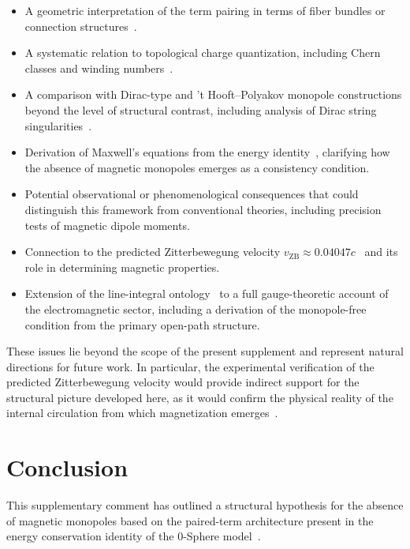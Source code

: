 \documentclass[12pt,letterpaper]{article}
\begin{document}
\begin{itemize}
\item A geometric interpretation of the term pairing in terms of fiber bundles or connection structures~\cite{Nakahara2003}.
\item A systematic relation to topological charge quantization, including Chern classes and winding numbers~\cite{Nakahara2003,tHooft1974}.
\item A comparison with Dirac-type and 't Hooft--Polyakov monopole constructions beyond the level of structural contrast, including analysis of Dirac string singularities~\cite{Dirac1931,tHooft1974,Polyakov1974}.
\item Derivation of Maxwell's equations from the energy identity~\cite{hanamura18203433}, clarifying how the absence of magnetic monopoles emerges as a consistency condition.
\item Potential observational or phenomenological consequences that could distinguish this framework from conventional theories, including precision tests of magnetic dipole moments.
\item Connection to the predicted Zitterbewegung velocity $v_{\mathrm{ZB}} \approx 0.04047c$~\cite{hanamura18356895,hanamura17765409} and its role in determining magnetic properties.
\item Extension of the line-integral ontology~\cite{hanamura18275142,hanamura18203433} to a full gauge-theoretic account of the electromagnetic sector, including a derivation of the monopole-free condition from the primary open-path structure.
\end{itemize}

These issues lie beyond the scope of the present supplement and represent natural directions for future work. In particular, the experimental verification of the predicted Zitterbewegung velocity would provide indirect support for the structural picture developed here, as it would confirm the physical reality of the internal circulation from which magnetization emerges~\cite{hanamura18356895}.

\section{Conclusion}

\justifying
This supplementary comment has outlined a structural hypothesis for the absence of magnetic monopoles based on the paired-term architecture present in the energy conservation identity of the 0-Sphere model~\cite{hanamura16759284,hanamura18603340}.
\end{document}

